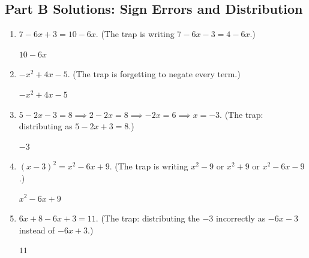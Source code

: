 \documentclass[14pt]{extarticle}
\begin{document}
\subsection*{Part B Solutions: Sign Errors and Distribution}
\begin{enumerate}
  \item \(7 - 6x + 3 = 10 - 6x\). (The trap is writing \(7 - 6x - 3 = 4 - 6x\).)

  \(\boxed{10 - 6x}\)

  \item \(-x^2 + 4x - 5\). (The trap is forgetting to negate every term.)

  \(\boxed{-x^2 + 4x - 5}\)

  \item \(5 - 2x - 3 = 8 \implies 2 - 2x = 8 \implies -2x = 6 \implies x = -3\). (The trap: distributing as \(5 - 2x + 3 = 8\).)

  \(\boxed{-3}\)

  \item \((x-3)^2 = x^2 - 6x + 9\). (The trap is writing \(x^2 - 9\) or \(x^2 + 9\) or \(x^2 - 6x - 9\).)

  \(\boxed{x^2 - 6x + 9}\)

  \item \(6x + 8 - 6x + 3 = 11\). (The trap: distributing the \(-3\) incorrectly as \(-6x - 3\) instead of \(-6x + 3\).)

  \(\boxed{11}\)
\end{enumerate}
\end{document}
